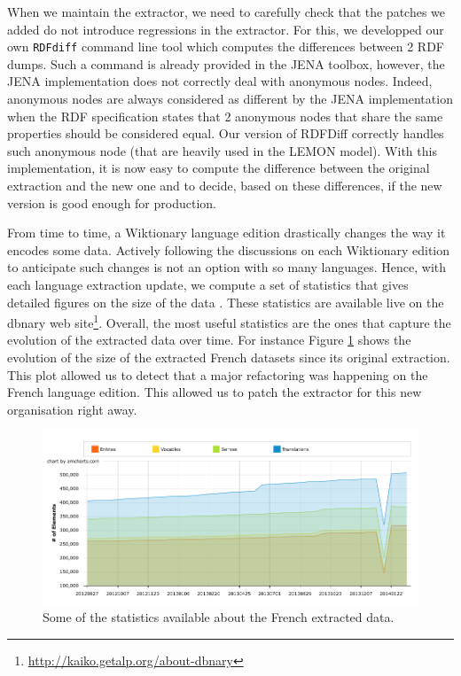 \documentclass[10pt, a4paper]{article}
\begin{document}
When we maintain the extractor, we need to carefully check that the patches we added do not introduce regressions in the extractor. For this, we developped our own \texttt{RDFdiff} command line tool which computes the differences between 2 RDF dumps. Such a command is already provided in the JENA toolbox, however, the JENA implementation does not correctly deal with anonymous nodes. Indeed, anonymous nodes are always considered as different by the JENA implementation when the RDF specification states that 2 anonymous nodes that share the same properties should be considered equal. Our version of RDFDiff correctly handles such anonymous node (that are heavily used in the LEMON model). With this implementation, it is now easy to compute the difference between the original extraction and the new one and to decide, based on these differences, if the new version is good enough for production.

From time to time, a Wiktionary language edition drastically changes the way it encodes some data. Actively following the discussions on each Wiktionary edition to anticipate such changes is not an option with so many languages. Hence, with each language extraction update, we compute a set of statistics that gives detailed figures on the size of the data . These statistics are available live on the dbnary web site\footnote{\url{http://kaiko.getalp.org/about-dbnary}}. Overall, the most useful statistics are the ones that capture the evolution of the extracted data over time. For instance Figure \ref{fig:french} shows the evolution of the size of the extracted French datasets since its original extraction. This plot allowed us to detect that a major refactoring was happening on the French language edition. This allowed us to patch the extractor for this new organisation right away.


\begin{figure}[htb]
	\begin{center}
		\includegraphics[width=\textwidth]{french.png}
	\end{center}
	\caption{Some of the statistics available about the French extracted data.}
	\label{fig:french}
\end{figure}
\end{document}
